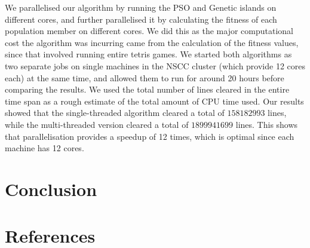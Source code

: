 \documentclass[12pt]{article}
\begin{document}
	We parallelised our algorithm by running the PSO and Genetic islands on different cores,
	and further parallelised it by calculating the fitness of each population member on different cores.
	We did this as the major computational cost the algorithm was incurring came from
	the calculation of the fitness values, since that involved running entire tetris games. We started both algorithms as two separate jobs on single machines
	in the NSCC cluster (which provide 12 cores each) at the same time, and allowed them to run for around 20
	hours before comparing the results. We used the total number of lines cleared
	in the entire time span as a rough estimate of the total amount of
	CPU time used. Our results showed that the single-threaded algorithm cleared
	a total of $158182993$ lines, while the multi-threaded version cleared a total
	of $1899941699$ lines. This shows that parallelisation provides a speedup of 12 times,
	which is optimal since each machine has 12 cores.

    \section{Conclusion}



    \section{References}
	
	
\end{document}
